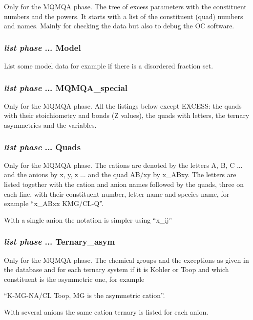 \documentclass[11pt]{article}
\begin{document}
Only for the MQMQA phase.  The tree of excess parameters with the
constituent numbers and the powers.  It starts with a list of the
constituent (quad) numbers and names.  Mainly for checking the data
but also to debug the OC software.

\subsubsection{{\em list phase} ... Model}

List some model data for example if there is a disordered fraction set.

\hypertarget{List what for mqmqa_special}{}
\subsubsection{{\em list phase} ... MQMQA\_special}

Only for the MQMQA phase.  All the listings below except EXCESS: the
quads with their stoichiometry and bonds (Z values), the quads with
letters, the ternary asymmetries and the variables.

\subsubsection{{\em list phase} ... Quads}

Only for the MQMQA phase.  The cations are denoted by the letters
A, B, C ... and the anions by x, y, z ...  and the quad AB/xy by
x\_ABxy.  The letters are listed together with the cation and anion
names followed by the quads, three on each line, with their constituent
number, letter name and species name, for example ``x\_ABxx KMG/CL-Q''.

With a single anion the notation is simpler using ``x\_{ij}''


\subsubsection{{\em list phase} ... Ternary\_asym}

Only for the MQMQA phase.  The chemical groups and the exceptions as
given in the database and for each ternary system if it is Kohler or
Toop and which constituent is the asymmetric one, for example

``K-MG-NA/CL Toop, MG is the asymmetric cation''.

With several anions the same cation ternary is listed for each anion.
\end{document}
